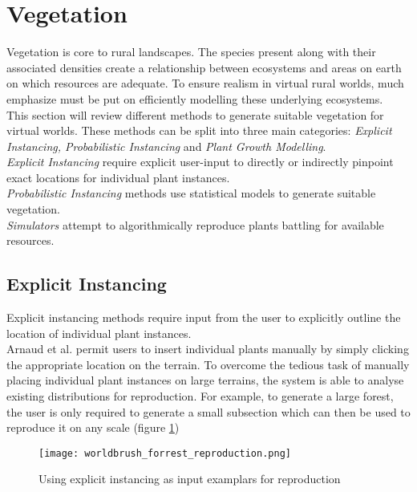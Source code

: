 \section{Vegetation}

Vegetation is core to rural landscapes. The species present along with their associated densities create a relationship between ecosystems and areas on earth on which resources are adequate. To ensure realism in virtual rural worlds, much emphasize must be put on efficiently modelling these underlying ecosystems.\\

This section will review different methods to generate suitable vegetation for virtual worlds. These methods can be split into three main categories: \textit{Explicit Instancing, Probabilistic Instancing} and \textit{Plant Growth Modelling}.\\

\textit{Explicit Instancing} require explicit user-input to directly or indirectly pinpoint exact locations for individual plant instances.\\

\textit{Probabilistic Instancing} methods use statistical models to generate suitable vegetation.\\ 

\textit{Simulators} attempt to algorithmically reproduce plants battling for available resources.\\

\subsection{Explicit Instancing} \label{Explicit Instancing}
Explicit instancing methods require input from the user to explicitly outline the location of individual plant instances. \\

Arnaud et al. \cite{Emilien} permit users to insert individual plants manually by simply clicking the appropriate location on the terrain. To overcome the tedious task of manually placing individual plant instances on large terrains, the system is able to analyse existing distributions for reproduction. For example, to generate a large forest, the user is only required to generate a small subsection which can then be used to reproduce it on any scale (figure \ref{Explicit instancing as input examplars}) \\

\begin{figure}[h]
  \centering
	\label{Explicit instancing as input examplars}
	\texttt{[image: worldbrush\_forrest\_reproduction.png]}
	\caption{Using explicit instancing as input examplars for reproduction \cite{Emilien}}
\end{figure}

